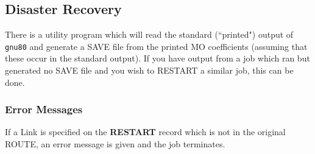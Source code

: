 \subsection{\sf Disaster Recovery}
There is a utility program which will read the standard (``printed") output
of {\tt gnu80} and generate a SAVE file from the printed MO coefficients (assuming
that these occur in the standard output). If you have output from
a job which ran but generated no SAVE file and you wish to RESTART a similar
job, this can be done.

\subsubsection{\sf Error Messages}
If a Link is specified on the {\bf RESTART} record which is
not in the original ROUTE, an error message is given and the job terminates.
